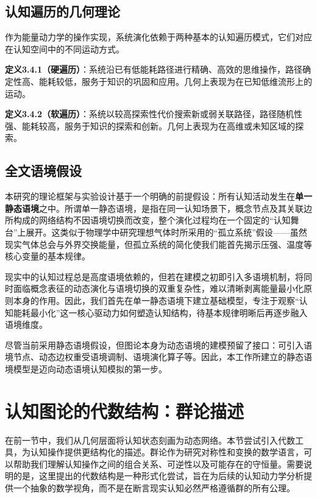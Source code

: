 \documentclass[12pt,a4paper]{article}
\begin{document}
\subsection{认知遍历的几何理论}

作为能量动力学的操作实现，系统演化依赖于两种基本的认知遍历模式，它们对应在认知空间中的不同运动方式。

\textbf{定义3.4.1（硬遍历）}：系统沿已有低能耗路径进行精确、高效的思维操作，路径确定性高、能耗较低，服务于知识的巩固和应用。几何上表现为在已知低维流形上的运动。

\textbf{定义3.4.2（软遍历）}：系统以较高探索性代价搜索新或弱关联路径，路径随机性强、能耗较高，服务于知识的探索和创新。几何上表现为在高维或未知区域的探索。

\subsection{全文语境假设}

本研究的理论框架与实验设计基于一个明确的前提假设：所有认知活动发生在\textbf{单一静态语境}之中。所谓单一静态语境，是指在同一认知场景下，概念节点及其关联边所构成的网络结构不因语境切换而改变，整个演化过程均在一个固定的“认知舞台”上展开。这类似于物理学中研究理想气体时所采用的“孤立系统”假设——虽然现实气体总会与外界交换能量，但孤立系统的简化使我们能首先揭示压强、温度等核心变量的基本规律。

现实中的认知过程总是高度语境依赖的，但若在建模之初即引入多语境机制，将同时面临概念表征的动态演化与语境切换的双重复杂性，难以清晰剥离能量最小化原则本身的作用。因此，我们首先在单一静态语境下建立基础模型，专注于观察“认知能耗最小化”这一核心驱动力如何塑造认知结构，待基本规律明晰后再逐步融入语境维度。

尽管当前采用静态语境假设，但图论本身为动态语境的建模预留了接口：可引入语境节点、动态边权重受语境调制、语境演化算子等。因此，本工作所建立的静态语境模型是迈向动态语境认知模拟的第一步。

\section{认知图论的代数结构：群论描述}

在前一节中，我们从几何层面将认知状态刻画为动态网络。本节尝试引入代数工具，为认知操作提供更结构化的描述。群论作为研究对称性和变换的数学语言，可以帮助我们理解认知操作之间的组合关系、可逆性以及可能存在的守恒量。需要说明的是，这里提出的代数结构是一种形式化尝试，旨在为后续的认知动力学分析提供一个抽象的数学视角，而不是在断言现实认知必然严格遵循群的所有公理。
\end{document}

